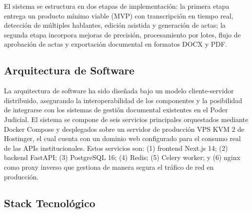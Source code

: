 \documentclass[12pt,a4paper,oneside]{report}
\begin{document}
El sistema se estructura en dos etapas de implementación: la primera etapa entrega un producto mínimo viable (MVP) con transcripción en tiempo real, detección de múltiples hablantes, edición asistida y generación de actas; la segunda etapa incorpora mejoras de precisión, procesamiento por lotes, flujo de aprobación de actas y exportación documental en formatos DOCX y PDF.

\subsection{Arquitectura de Software}

La arquitectura de software ha sido diseñada bajo un modelo cliente-servidor distribuido, asegurando la interoperabilidad de los componentes y la posibilidad de integrarse con los sistemas de gestión documental existentes en el Poder Judicial. El sistema se compone de seis servicios principales orquestados mediante Docker Compose y desplegados sobre un servidor de producción VPS KVM 2 de Hostinger, el cual cuenta con un dominio web configurado para el consumo real de las APIs institucionales. Estos servicios son: (1) frontend Next.js 14; (2) backend FastAPI; (3) PostgreSQL 16; (4) Redis; (5) Celery worker; y (6) nginx como proxy inverso que gestiona de manera segura el tráfico de red en producción.

\subsection{Stack Tecnológico}
\end{document}
